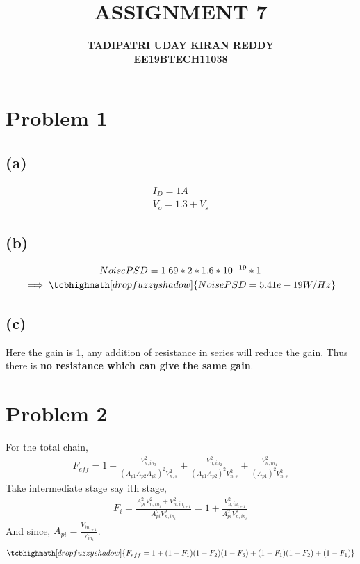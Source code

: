 \documentclass{article}
\begin{document}
\title{{\textbf{ASSIGNMENT 7}}}
\author{\textbf{TADIPATRI UDAY KIRAN REDDY}\\\textbf{EE19BTECH11038}}
\maketitle

\section*{\hfil Problem 1}
\subsection*{(a)}
\begin{gather*}
	I_D = 1A\\
	V_o = 1.3 + V_s
\end{gather*}
\subsection*{(b)}
\begin{gather*}
NoisePSD = 1.69*2*1.6*10^{-19}*1\\
\implies \tcbhighmath[drop fuzzy shadow]{NoisePSD = 5.41e-19 W/Hz}
\end{gather*}
\subsection*{(c)}
Here the gain is 1, any addition of resistance in series will reduce the gain. Thus there is \textbf{no resistance which can give the same gain}.
\section*{\hfil Problem 2}
For the total chain,
\begin{gather*}
	F_{eff} = 1 + \frac{V_{n, in_{3}}^2}{(A_{p1}A_{p2}A_{p3})^2V_{n, s}^2} + \frac{V_{n, in_{2}}^2}{(A_{p1}A_{p2})^2V_{n, s}^2} + \frac{V_{n, in_{1}}^2}{(A_{p1})^2V_{n, s}^2}
\end{gather*}
Take intermediate stage say ith stage,
\begin{gather*}
	F_i = \frac{A_{pi}^2V_{n, in_i}^2 + V_{n, in_{i+1}}^2}{A_{pi}^2V_{n, in_i}^2} = 1 + \frac{V_{n, in_{i+1}}^2}{A_{pi}^2V_{n, in_i}^2}
\end{gather*}
And since, $A_{pi} = \frac{V_{in_{i+1}}}{V_{in_{i}}}$.
\begin{gather*}
	\tcbhighmath[drop fuzzy shadow]{F_{eff} = 1 + (1-F_1)(1-F_2)(1-F_3) + (1-F_1)(1-F_2) + (1-F_1)}
\end{gather*}
\end{document}
